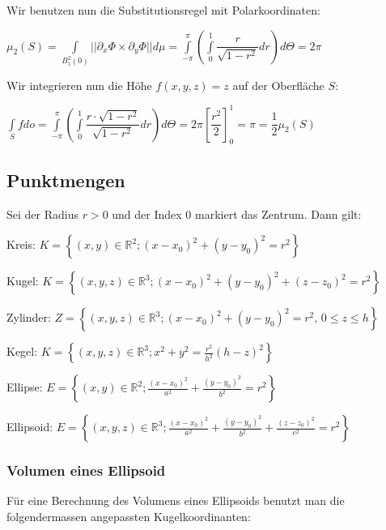 \documentclass[a4paper, fontsize = 8pt, landscape]{scrartcl}
\begin{document}
\begin{multicols*}{3}
    Wir benutzen nun die Substitutionsregel mit Polarkoordinaten:

    \begin{center}
        $\mu_2(S) = \displaystyle \int\limits_{B_1^2(0)} || \partial_x \Phi \times \partial_y \Phi|| d\mu = \int\limits_{-\pi}^\pi \left( \int\limits_0^1 \dfrac{r}{\sqrt{1 - r^2}} dr \right) d\Theta = 2\pi$
    \end{center}

    Wir integrieren nun die Höhe $f(x,y,z) = z$ auf der Oberfläche $S$:

    \begin{center}
        $\displaystyle \int\limits_S  f do = \int\limits_{-\pi}^{\pi} \left( \int\limits_0^1 \dfrac{r \cdot \sqrt{1 - r^2}}{\sqrt{1 - r^2}} dr \right) d\Theta = 2\pi \left[\dfrac{r^2}{2}\right]^1_0 = \pi = \dfrac{1}{2} \mu_2(S)$
    \end{center}


    \subsection{Punktmengen}

    Sei der Radius $r > 0$ und der Index 0 markiert das Zentrum. Dann gilt: \medskip

    Kreis: $K = \left\{(x, y)\in \mathbb{R}^2; (x-x_0)^2+(y-y_0)^2 = r^2 \right\}$ \medskip

    Kugel: $K = \left\{(x, y, z)\in \mathbb{R}^3; (x-x_0)^2+(y-y_0)^2+(z-z_0)^2 = r^2 \right\}$ \medskip

    Zylinder: $Z=\left\{(x, y, z)\in \mathbb{R}^3; (x-x_0)^2+(y-y_0)^2 =r^2, \, 0\le z \le h \right\}$ \medskip

    Kegel: $K=\left\{(x, y, z)\in \mathbb{R}^3; x^2+y^2 = \frac{r^2}{h^2}(h-z)^2 \right\}$ \medskip

    Ellipse: $E=\left\{(x, y)\in \mathbb{R}^2; \frac{(x-x_0)^2}{a^2}+\frac{(y-y_0)^2 }{b^2} = r^2 \right\}$ \medskip

    Ellipsoid: $E=\left\{(x, y, z)\in \mathbb{R}^3; \frac{(x-x_0)^2}{a^2}+\frac{(y-y_0)^2}{b^2} +\frac{(z-z_0)^2}{c^2} = r^2 \right\}$

    \subsubsection{Volumen eines Ellipsoid}

    Für eine Berechnung des Volumens eines Ellipsoids benutzt man die folgendermassen angepassten Kugelkoordinanten:


\end{multicols*}
\end{document}

